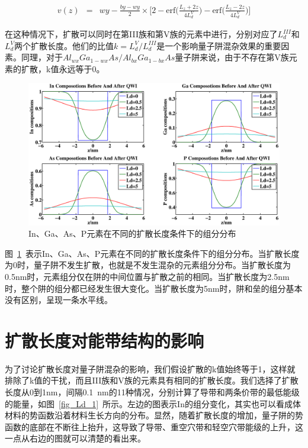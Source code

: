 \documentclass{ZJUthesis}
\begin{document}
\begin{eqnarray}
    v(z)&=&wy-\frac{by-wy}{2} \times \biggr[2-\textrm{erf}\biggr(\frac{L_z+2z}{4L_d^{V}}\biggr) -\textrm{erf}\biggr(\frac{L_z-2z}{4L_d^{V}}\biggr)\biggr]
\end{eqnarray}

在这种情况下，扩散可以同时在第III族和第V族的元素中进行，分别对应了$L_d^{III}$和$L_d^V$两个扩散长度。他们的比值$k=L_d^V/L_d^{III}$是一个影响量子阱混杂效果的重要因素。同理，对于$Al_{wx}Ga_{1-wx}As/Al_{bx}Ga_{1-bx}As$量子阱来说，由于不存在第V族元素的扩散，k值永远等于0。

\begin{figure}[htbp]
    \centering
    \includegraphics[width=1.0\textwidth]{./Pictures/composition.eps}
    \caption{In、Ga、As、P元素在不同的扩散长度条件下的组分分布}
    \label{fig_composition}
\end{figure}

图~\ref{fig_composition}~表示In、Ga、As、P元素在不同的扩散长度条件下的组分分布。当扩散长度为0时，量子阱不发生扩散，也就是不发生混杂的元素组分分布。当扩散长度为0.5nm时，元素组分仅在阱的中间位置与扩散之前的相同。当扩散长度为2.5nm时，整个阱的组分都已经发生很大变化。当扩散长度为5nm时，阱和垒的组分基本没有区别，呈现一条水平线。

\section{扩散长度对能带结构的影响}

为了讨论扩散长度对量子阱混杂的影响，我们假设扩散的k值始终等于1，这样就排除了k值的干扰，而且III族和V族的元素具有相同的扩散长度。我们选择了扩散长度从0到1nm，间隔0.1~nm的11种情况，分别计算了导带和两条价带的最低能级的能量，如图~\ref{fig_Ld_1}~所示。左边的图表示In的组分变化，其实也可以看成体材料的势函数沿着材料生长方向的分布。显然，随着扩散长度的增加，量子阱的势函数的底部在不断往上抬升，这导致了导带、重空穴带和轻空穴带能级的上升，这一点从右边的图就可以清楚的看出来。
\end{document}
